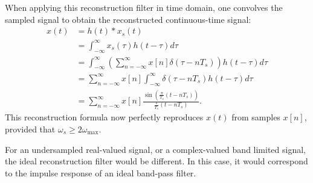 When applying this reconstruction filter in time domain, one convolves the sampled signal to obtain the 
reconstructed continuous-time signal:
\begin{align}
  x(t) & = h(t)*x_s(t)                                                                                            \\
       & = \int_{-\infty}^{\infty} x_s(\tau)h(t-\tau)d\tau                                                        \\
       & = \int_{-\infty}^{\infty}\left( \sum_{n=-\infty}^{\infty} x[n] \delta(\tau-n T_s)\right) h(t-\tau) d\tau \\
       & = \sum_{n=-\infty}^{\infty} x[n] \int_{-\infty}^{\infty} \delta(\tau-nT_s) h(t-\tau)d\tau                \\
       & = \sum_{n=-\infty}^{\infty} x[n] \frac{\sin(\frac{\pi}{T_s}(t-n T_s))}{\frac{\pi}{T_s}(t-nT_s)}.
\end{align}
This reconstruction formula now perfectly reproduces $x(t)$ from
samples $x[n]$, provided that $\omega_s \ge 2\omega_{\mathrm{max}}$.

For an undersampled real-valued signal, or a complex-valued band limited signal, the ideal reconstruction 
filter would be different. In this case, it would correspond to the impulse response of an ideal band-pass filter.

